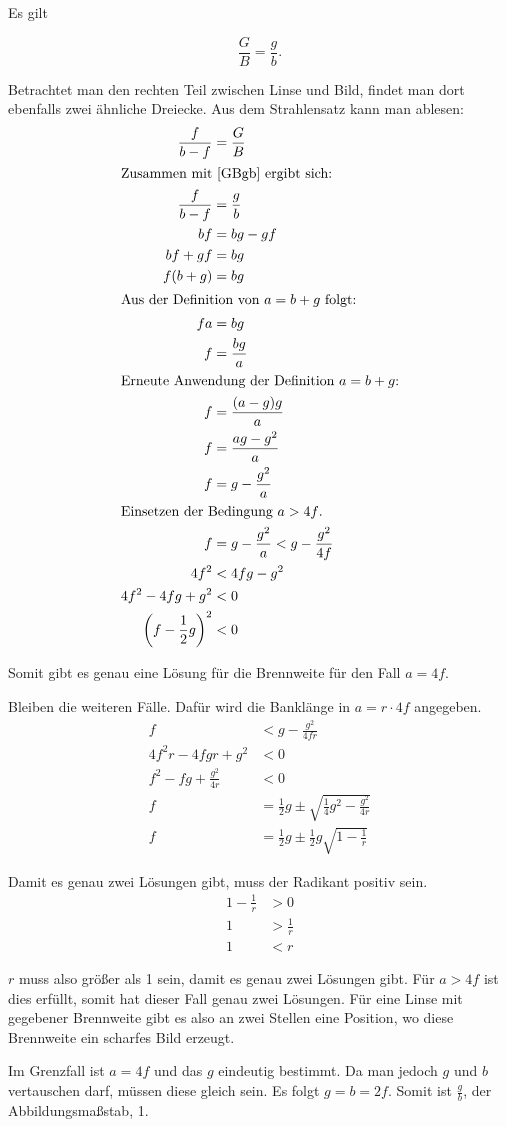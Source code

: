 \documentclass[11pt, ngerman, fleqn]{article}
\newcommand{\half}{\frac 12}
\begin{document}
Es gilt

\begin{equation}
\label{GBgb}
\frac{G}{B} = \frac{g}{b}.
\end{equation}

Betrachtet man den rechten Teil zwischen Linse und Bild, findet man dort ebenfalls zwei ähnliche Dreiecke. Aus dem Strahlensatz kann man ablesen:
\begin{align*}
\frac{f}{b-f} &= \frac{G}{B} \\
%
\intertext{Zusammen mit \eqref{GBgb} ergibt sich:}
%
\frac{f}{b-f} &= \frac{g}{b} \\
bf &= bg-gf \\
bf+gf &= bg \\
f(b+g) &= bg \\
%
\intertext{Aus der Definition von $a = b + g$ folgt:}
%
fa &= bg \\
f &= \frac{bg}{a} \\
%
\intertext{Erneute Anwendung der Definition $a = b + g$:}
%
f &= \frac{(a-g)g}{a} \\
f &= \frac{ag-g^2}{a} \\
f &= g - \frac{g^2}{a} \\
%
\intertext{Einsetzen der Bedingung $a > 4f$.}
%
f &= g - \frac{g^2}{a} < g - \frac{g^2}{4f} \\
4f^2 &< 4fg - g^2 \\
4f^2 - 4fg + g^2 &< 0 \\
\left(f-\half g \right)^2 &< 0
\end{align*}

Somit gibt es genau eine Lösung für die Brennweite für den Fall $a = 4f$.

Bleiben die weiteren Fälle. Dafür wird die Banklänge in $a = r \cdot 4f$ angegeben.
\begin{align*}
f &< g - \frac{g^2}{4fr} \\
4f^2r - 4fgr + g^2 &< 0 \\
f^2 - fg + \frac{g^2}{4r} &< 0 \\
f &= \half g \pm \sqrt{\frac{1}{4} g^2 - \frac{g^2}{4r}} \\
f &= \half g \pm \half g \sqrt{1 - \frac{1}{r}}
\end{align*}

Damit es genau zwei Lösungen gibt, muss der Radikant positiv sein.
\begin{align*}
1 - \frac{1}{r} &> 0 \\
1 &> \frac{1}{r} \\
1 &< r
\end{align*}

$r$ muss also größer als 1 sein, damit es genau zwei Lösungen gibt. Für $a > 4f$ ist dies erfüllt, somit hat dieser Fall genau zwei Lösungen. Für eine Linse mit gegebener Brennweite gibt es also an zwei Stellen eine Position, wo diese Brennweite ein scharfes Bild erzeugt.


Im Grenzfall ist $a = 4f$ und das $g$ eindeutig bestimmt. Da man jedoch $g$ und $b$ vertauschen darf, müssen diese gleich sein. Es folgt $g = b = 2f$. Somit ist $\frac{g}{b}$, der Abbildungsmaßstab, 1.


%
%
\end{document}
